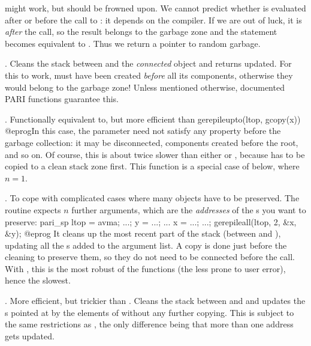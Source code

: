 \noindent might work, but should be frowned upon. We cannot predict whether
 is evaluated after or before the call to : it
depends on the compiler. If we are out of luck, it is \emph{after} the
call, so the result belongs to the garbage zone and the 
statement becomes equivalent to . Thus we return a
pointer to random garbage.


. Cleans the stack between
 and the \emph{connected} object  and returns 
updated. For this to work,  must have been created \emph{before} all
its components, otherwise they would belong to the garbage zone! Unless
mentioned otherwise, documented PARI functions guarantee this.

. Functionally equivalent to,
but more efficient than
\bprog
  gerepileupto(ltop, gcopy(x))
@eprog\noindent In this case, the  parameter  need not
satisfy any property before the garbage collection: it may be disconnected,
components created before the root, and so on. Of course, this is about
twice slower than either  or , because
 has to be copied to a clean stack zone first. This function is a
special case of  below, where $n=1$.

.
To cope with complicated cases where many objects have to be preserved. The
routine expects $n$ further arguments, which are the \emph{addresses} of
the s you want to preserve:
\bprog
  pari_sp ltop = avma;
  ...; y = ...; ... x = ...; ...;
  gerepileall(ltop, 2, &x, &y);
@eprog\noindent
It cleans up the most recent part of the
stack (between  and ), updating all the s added
to the argument list. A copy is done just before the cleaning to preserve
them, so they do not need to be connected before the call. With
, this is the most robust of the  functions
(the less prone to user error), hence the slowest.

.
More efficient, but trickier than . Cleans the stack between
 and  and updates the s pointed at by the
elements of  without any further copying. This is subject to the
same restrictions as , the only difference being that more than
one address gets updated.

